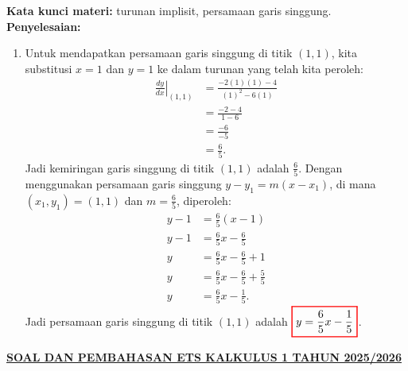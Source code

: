 \documentclass[10pt,openany,a4paper]{article}
\theoremstyle{definition}
\theoremstyle{definition}
\theoremstyle{plain}
\newenvironment{jawab}[2][tes]{
\textbf{Kata kunci materi:} #1.\\
\textbf{Penyelesaian:} #2
}{}
\begin{document}
\begin{enumerate}
\begin{jawab}[turunan implisit, persamaan garis singgung]
{\begin{enumerate}
                    \item Untuk mendapatkan persamaan garis singgung di titik $(1,1)$, kita substitusi $x=1$ dan $y=1$ ke dalam turunan yang telah kita peroleh:
                    \begin{align*}
                        \left.\frac{dy}{dx}\right|_{(1,1)} &= \frac{-2(1)(1) - 4}{(1)^2 - 6(1)}\\
                        &= \frac{-2 - 4}{1 - 6}\\
                        &= \frac{-6}{-5}\\
                        &= \frac{6}{5}.
                    \end{align*}
                    Jadi kemiringan garis singgung di titik $(1,1)$ adalah $\frac{6}{5}$. Dengan menggunakan persamaan garis singgung $y - y_1 = m(x - x_1)$, di mana $(x_1,y_1)=(1,1)$ dan $m=\frac{6}{5}$, diperoleh:
                    \begin{align*}
                        y - 1 &= \frac{6}{5}(x - 1)\\
                        y - 1 &= \frac{6}{5}x - \frac{6}{5}\\
                        y &= \frac{6}{5}x - \frac{6}{5} + 1\\
                        y &= \frac{6}{5}x - \frac{6}{5} + \frac{5}{5}\\
                        y &= \frac{6}{5}x - \frac{1}{5}.
                    \end{align*}
                    Jadi persamaan garis singgung di titik $(1,1)$ adalah $\colorlet{oldcolor}{.}
        \color{red}
        \setlength{\fboxrule}{1pt} \boxed{\color{oldcolor}y = \frac{6}{5}x - \frac{1}{5}}\color{oldcolor}$.
                \end{enumerate}
            }
                
            \end{jawab}
        \end{enumerate}
\newpage
 \begin{center}
	{\underline{\textbf{\MakeUppercase{Soal dan Pembahasan ETS Kalkulus 1 Tahun 2025/2026}}}}
    \end{center}
\end{document}
